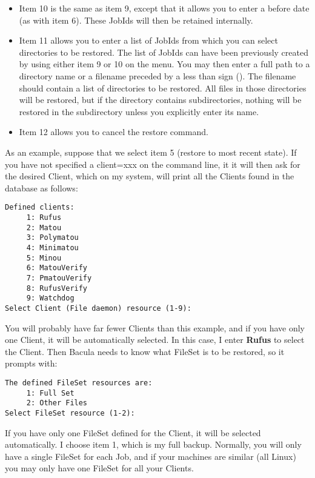 \begin{itemize}
\item Item 10 is the same as item 9, except that it allows you to enter
   a before date (as with item 6). These JobIds will then be retained
   internally.

\item Item 11 allows you to enter a list of JobIds from which you can
   select directories to be restored. The list of JobIds can have been
   previously created by using either item 9 or 10 on the menu.  You
   may then enter a full path to a directory name or a filename preceded
   by a less than sign (\lt{}). The filename should contain a list
   of directories to be restored.  All files in those directories will
   be restored, but if the directory contains subdirectories, nothing
   will be restored in the subdirectory unless you explicitly enter its
   name.

\item Item 12 allows you to cancel the restore command.  
\end{itemize}

As an example, suppose that we select item 5 (restore to most recent state).
If you have not specified a client=xxx on the command line, it
it will then ask for the desired Client, which on my system, will print all
the Clients found in the database as follows:  

\footnotesize
\begin{verbatim}
Defined clients:
     1: Rufus
     2: Matou
     3: Polymatou
     4: Minimatou
     5: Minou
     6: MatouVerify
     7: PmatouVerify
     8: RufusVerify
     9: Watchdog
Select Client (File daemon) resource (1-9):
\end{verbatim}
\normalsize

You will probably have far fewer Clients than this example, and if you have
only one Client, it will be automatically selected.  In this case, I enter
{\bf Rufus} to select the Client. Then  Bacula needs to know what FileSet is
to be restored, so it prompts with:  

\footnotesize
\begin{verbatim}
The defined FileSet resources are:
     1: Full Set
     2: Other Files
Select FileSet resource (1-2):
\end{verbatim}
\normalsize

If you have only one FileSet defined for the Client, it will be selected
automatically.  I choose item 1, which is my full backup.  Normally, you
will only have a single FileSet for each Job, and if your machines are
similar (all Linux) you may only have one FileSet for all your Clients.

